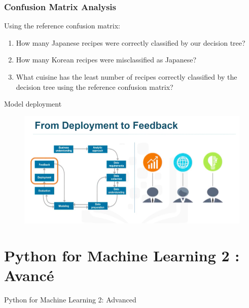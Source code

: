 \documentclass{beamer}
\begin{document}
\begin{frame}
	\frametitle{Confusion Matrix Analysis}
	
	Using the reference confusion matrix:
	
	\begin{enumerate}
		\item How many Japanese recipes were correctly classified by our decision tree?
		
		\item How many Korean recipes were misclassified as Japanese?
		
		\item What cuisine has the least number of recipes correctly classified by the decision tree using the reference confusion matrix?
	\end{enumerate}
\end{frame}

\begin{frame}{Model deployment}
	\begin{figure}
		\includegraphics[width=\textwidth]{deploy.png}
	\end{figure}
\end{frame}


\section{Python for Machine Learning 2 : Avancé}
{
\begin{frame}{Python for Machine Learning 2: Advanced}
\end{frame}
}
\end{document}
